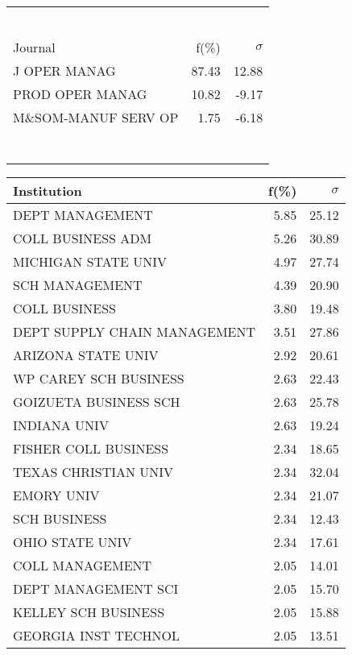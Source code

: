 \documentclass[a4paper,11pt]{report}
\begin{document}
\begin{landscape}
\begin{table}[!ht]
{\begin{tabular}{|l r  r|}
 &  & \\
 &  & \\
 &  & \\
 &  & \\
 &  & \\
 &  & \\
\hline
\hline
Journal & f(\%) & $\sigma$\\
\hline
J OPER MANAG & 87.43 & 12.88\\
PROD OPER MANAG & 10.82 & -9.17\\
M\&SOM-MANUF SERV OP & 1.75 & -6.18\\
 &  & \\
 &  & \\
 &  & \\
 &  & \\
 &  & \\
 &  & \\
 &  & \\
\hline
\end{tabular}
}
{\scriptsize\begin{tabular}{|l r r|}
\hline
Institution & f(\%) & $\sigma$\\
\hline
DEPT MANAGEMENT & 5.85 & 25.12\\
COLL BUSINESS ADM & 5.26 & 30.89\\
MICHIGAN STATE UNIV & 4.97 & 27.74\\
SCH MANAGEMENT & 4.39 & 20.90\\
COLL BUSINESS & 3.80 & 19.48\\
DEPT SUPPLY CHAIN MANAGEMENT & 3.51 & 27.86\\
ARIZONA STATE UNIV & 2.92 & 20.61\\
WP CAREY SCH BUSINESS & 2.63 & 22.43\\
GOIZUETA BUSINESS SCH & 2.63 & 25.78\\
INDIANA UNIV & 2.63 & 19.24\\
FISHER COLL BUSINESS & 2.34 & 18.65\\
TEXAS CHRISTIAN UNIV & 2.34 & 32.04\\
EMORY UNIV & 2.34 & 21.07\\
SCH BUSINESS & 2.34 & 12.43\\
OHIO STATE UNIV & 2.34 & 17.61\\
COLL MANAGEMENT & 2.05 & 14.01\\
DEPT MANAGEMENT SCI & 2.05 & 15.70\\
KELLEY SCH BUSINESS & 2.05 & 15.88\\
GEORGIA INST TECHNOL & 2.05 & 13.51\\

\end{tabular}}
\end{table}
\end{landscape}
\end{document}
